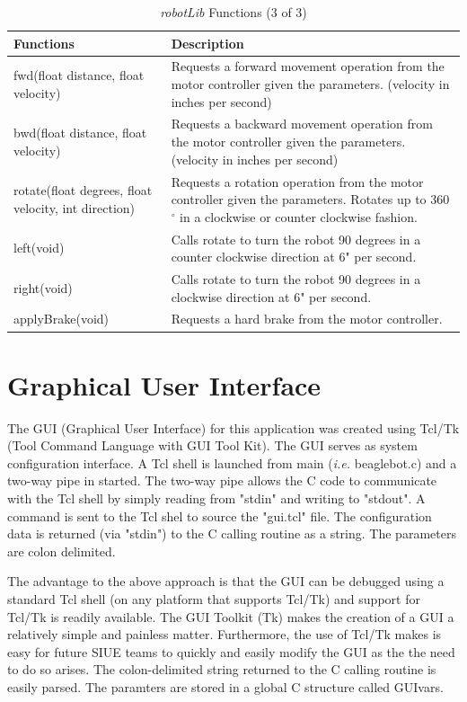 \documentclass[12pt,oneside,final]{siuethesis}
\theoremstyle{definition}
\begin{document}
\begin{table}[htbp!]
	\centering
	\begin{tabular}{|p{6cm} | p{9cm}|}
		\hline
		Functions & Description \\ \hline
		fwd(float distance, float velocity) & Requests a forward movement operation from the motor controller given the parameters. (velocity in inches per second) \\ \hline
		bwd(float distance, float velocity) & Requests a backward movement operation from the motor controller given the parameters. (velocity in inches per second) \\ \hline
		rotate(float degrees, float velocity, int direction) & Requests a rotation operation from the motor controller given the  parameters. Rotates up to 360$^{\circ}$ in a clockwise or counter clockwise fashion.  \\ \hline
		left(void) & Calls rotate to turn the robot 90 degrees in a counter clockwise direction at 6" per second. \\ \hline
		right(void) & Calls rotate to turn the robot 90 degrees in a clockwise direction at 6" per second. \\ \hline
		applyBrake(void) & Requests a hard brake from the motor controller. \\ \hline
		
		\end{tabular}
		 \caption{\emph{robotLib} Functions (3 of 3)}
 	\label{Tab:robotLibFun3}
\end{table}


\section{Graphical User Interface}

The GUI (Graphical User Interface) for this application was created using Tcl/Tk (Tool Command Language with GUI Tool Kit). The GUI serves as system configuration interface. A Tcl shell is launched from main (\emph{i.e.} beaglebot.c) and a two-way pipe in started. The two-way pipe allows the C code to communicate with the Tcl shell by simply reading from "stdin" and writing to "stdout".  A command is sent to the Tcl shel to source the "gui.tcl" file. The configuration data is returned (via "stdin") to the C calling routine as a string.  The parameters are colon delimited.

The advantage to the above approach is that the GUI can be debugged using a standard Tcl shell (on any platform that supports Tcl/Tk) and support for Tcl/Tk is readily available. The GUI Toolkit (Tk) makes the creation of a GUI a relatively simple and painless matter. Furthermore, the use of Tcl/Tk makes is easy for future SIUE teams to quickly and easily modify the GUI as the the need to do so arises. The colon-delimited string returned to the C calling routine is easily parsed. The paramters are stored in a global C structure called GUIvars.
\end{document}
